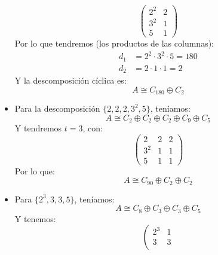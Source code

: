 \begin{ejemplo}
\begin{itemize}
            \begin{equation*}
                \left(\begin{array}{ccc}
                    2^2 & 2 \\
                    3^2 & 1 \\
                    5 & 1  
                \end{array}\right)
            \end{equation*}
            Por lo que tendremos (los productos de las columnas):
            \begin{align*}
                d_1 &= 2^2 \cdot 3^2 \cdot 5 = 180 \\
                d_2 &= 2\cdot 1\cdot 1 = 2
            \end{align*}
            Y la descomposición cíclica es:
            \begin{equation*}
                A\cong C_{180}\oplus C_2
            \end{equation*}
        \item Para la descomposición $\{2,2,2,3^2,5\}$, teníamos:
            \begin{equation*}
                A\cong C_2 \oplus C_2 \oplus C_2 \oplus C_9 \oplus C_5
            \end{equation*}
            Y tendremos $t=3$, con:
            \begin{equation*}
                \left(\begin{array}{ccc}
                    2 & 2 & 2 \\
                    3^2 & 1 & 1 \\
                    5 & 1 & 1
                \end{array}\right)
            \end{equation*}
            Por lo que:
            \begin{equation*}
                A\cong C_{90} \oplus C_2 \oplus C_2
            \end{equation*}
        \item Para $\{2^3, 3,3,5\}$, teníamos:
            \begin{equation*}
                A\cong C_8\oplus C_3\oplus C_3\oplus C_5
            \end{equation*}
            Y tenemos:
            \begin{equation*}
                \left(\begin{array}{ccc}
                    2^3 & 1 \\
                    3 & 3 \\

\end{array}
\end{equation*}
\end{itemize}
\end{ejemplo}
